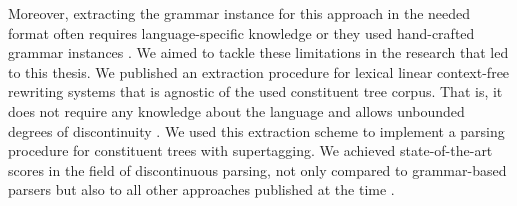 \documentclass[../document.tex]{subfiles}
\begin{document}
    Moreover, extracting the grammar instance for this approach in the needed format often requires language-specific knowledge \citep{Kas17,Bla18} or they used hand-crafted grammar instances \citep{Hoc07}.
    We aimed to tackle these limitations in the research that led to this thesis.
    We published an extraction procedure for lexical linear context-free rewriting systems that is agnostic of the used constituent tree corpus. That is, it does not require any knowledge about the language and allows unbounded degrees of discontinuity \citep{MoeRup20}.
    We used this extraction scheme to implement a parsing procedure for constituent trees with supertagging.
    We achieved state-of-the-art scores in the field of discontinuous parsing, not only compared to grammar-based parsers but also to all other approaches published at the time \citep{RupMoe21,Rup22}.
\end{document}
